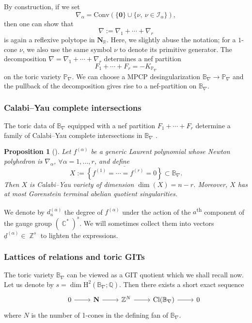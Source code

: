 \documentclass[12pt,a4paper,oneside]{amsart}
\numberwithin{equation}{section}
\newtheorem{prop}[thm]{Proposition}
\theoremstyle{definition}
\theoremstyle{remark}
\DeclareMathOperator{\C}{\mathbb{C}}
\DeclareMathOperator{\Z}{\mathbb{Z}}
\newcommand{\cB}{\mathbb{B}}
\begin{document}
By construction, if we set %
\begin{equation*}
    \nabla_{\alpha}=\mathrm{Conv}\left(\{\mathbf{0}\}\cup\{\nu,~\nu\in \mathcal{I}_{\alpha}\}\right),
\end{equation*}
then one can show that 
\begin{equation*}
    \nabla :=\nabla_{1}+\cdots+\nabla_{r}
\end{equation*}
is again a reflexive polytope in \(\mathbf{N}_{\mathbb{R}}\).
Here, we slightly abuse the notation; for a \(1\)-cone \(\nu\), 
we also use the same symbol \(\nu\)
to denote its primitive generator. The decomposition 
\(\nabla =\nabla_{1}+\cdots+\nabla_{r}\) determines a
nef partition
\begin{equation*}
    F_{1}+\cdots+F_{r}=-K_{\mathbb{P}_{\nabla}}
\end{equation*}
on the toric variety \(\mathbb{P}_{\nabla}\).
We can choose a MPCP desingularization \(\mathbb{B}_{\nabla}\to\mathbb{P}_{\nabla}\)
and the pullback of the decomposition gives rise to a nef-partition on \(\mathbb{B}_{\nabla}\).


\subsubsection{Calabi--Yau complete intersections}
The toric data of $\cB_{\nabla}$ equipped with a nef partition $F_1 + \cdots + F_r$ determine a family of 
Calabi--Yau complete intersections in 
$\cB_{\nabla}$ \cite{Batyrev:1994pg}.
\begin{prop}[{\cite[Proposition 4.15]{Batyrev:1994pg}}] 
Let $f^{(\alpha)}$ be a generic Laurent polynomial whose Newton polyhedron is $\nabla_{\alpha}$, $\forall \alpha=1, \dots, r$, and define 
\begin{equation*}
	X:=\overline{ \left\{ f^{(1)}=\cdots=f^{(r)}=0\right\}} \subset \cB_{\nabla} .
\end{equation*}
Then $X$ is Calabi--Yau variety of dimension $\dim (X)=n-r$. Moreover,
\(X\) has at most Gorenstein terminal abelian quotient singularities.
\end{prop}
We denote by $d_a^{(\alpha)} $ the degree of $f^{(\alpha)}$ under the action of the $a$\textsuperscript{th} component
of the gauge group $(\C^{\ast})^{s}$. 
We will sometimes collect them into vectors $\underline{d}^{(\alpha)} \in \Z^s$ to lighten the expressions.

\subsubsection{Lattices of relations and toric GITs}
\label{sec:latticeL}
The toric variety \(\mathbb{B}_{\nabla}\) can be viewed as a GIT quotient which
we shall recall now.
Let us denote by \(s=\dim\mathrm{H}^{2}(\cB_{\nabla};\mathbb{Q})\).
Then there exists a short exact sequence 
\begin{equation*}
\begin{tikzcd}
    &0\ar[r] &\mathbf{N}\ar[r] &\mathbb{Z}^{N}
    \ar[r] &\mathrm{Cl}(\mathbb{B}_{\nabla})\ar[r] &0
\end{tikzcd}
\end{equation*}
where \(N\) is the number of 1-cones in the defining fan of \(\mathbb{B}_{\nabla}\).
\end{document}
